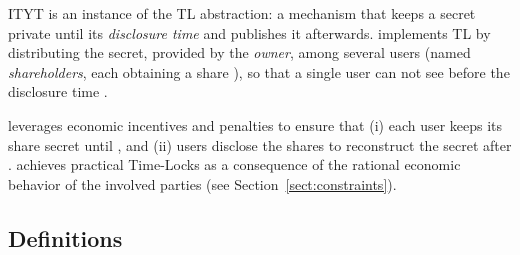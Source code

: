 %
%






ITYT is an instance of the TL abstraction: a mechanism that keeps a secret \secret private until its {\em disclosure time} \td and publishes it afterwards.
%
\shortname implements TL by distributing the secret, provided by the {\em owner}, among several users (named {\em shareholders}, each obtaining a share \share), so that a single user can not see  \secret before the disclosure time \td.

\shortname leverages economic incentives and penalties to ensure that (i) each user keeps its share secret until \td, and (ii) users disclose the shares to reconstruct the secret after \td.
%
%
%
\shortname achieves practical Time-Locks as a consequence of the rational economic behavior of the involved parties
(see Section~\ref{sect:constraints}).

\subsection{Definitions}


